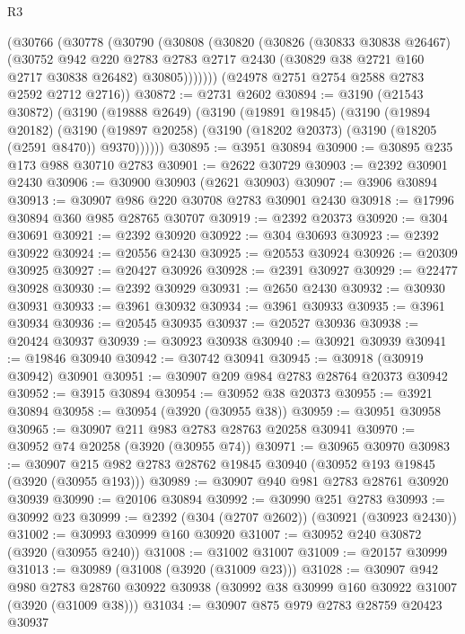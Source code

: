 \begin{lexlean}{R3}
\begin{coremodule}
      (@30766
        (@30778
          (@30790
            (@30808
              (@30820
                (@30826
                  (@30833 @30838 @26467)
                  (@30752
                    @942
                    @220
                    @2783
                    @2783
                    @2717
                    @2430
                    (@30829 @38 @2721 @160 @2717 @30838 @26482)
                    @30805)))))))
      (@24978 @2751 @2754 @2588 @2783 @2592 @2712 @2716))
@30872 := @2731 @2602
@30894 := @3190
    (@21543 @30872)
    (@3190
      (@19888 @2649)
      (@3190
        (@19891 @19845)
        (@3190
          (@19894 @20182)
          (@3190 (@19897 @20258) (@3190 (@18202 @20373) (@3190 (@18205 (@2591 @8470)) @9370))))))
@30895 := @3951 @30894
@30900 := @30895 @235 @173 @988 @30710 @2783
@30901 := @2622 @30729
@30903 := @2392 @30901 @2430
@30906 := @30900 @30903 (@2621 @30903)
@30907 := @3906 @30894
@30913 := @30907 @986 @220 @30708 @2783 @30901 @2430
@30918 := @17996 @30894 @360 @985 @28765 @30707
@30919 := @2392 @20373
@30920 := @304 @30691
@30921 := @2392 @30920
@30922 := @304 @30693
@30923 := @2392 @30922
@30924 := @20556 @2430
@30925 := @20553 @30924
@30926 := @20309 @30925
@30927 := @20427 @30926
@30928 := @2391 @30927
@30929 := @22477 @30928
@30930 := @2392 @30929
@30931 := @2650 @2430
@30932 := @30930 @30931
@30933 := @3961 @30932
@30934 := @3961 @30933
@30935 := @3961 @30934
@30936 := @20545 @30935
@30937 := @20527 @30936
@30938 := @20424 @30937
@30939 := @30923 @30938
@30940 := @30921 @30939
@30941 := @19846 @30940
@30942 := @30742 @30941
@30945 := @30918 (@30919 @30942) @30901
@30951 := @30907 @209 @984 @2783 @28764 @20373 @30942
@30952 := @3915 @30894
@30954 := @30952 @38 @20373
@30955 := @3921 @30894
@30958 := @30954 (@3920 (@30955 @38))
@30959 := @30951 @30958
@30965 := @30907 @211 @983 @2783 @28763 @20258 @30941
@30970 := @30952 @74 @20258 (@3920 (@30955 @74))
@30971 := @30965 @30970
@30983 := @30907 @215 @982 @2783 @28762 @19845 @30940 (@30952 @193 @19845 (@3920 (@30955 @193)))
@30989 := @30907 @940 @981 @2783 @28761 @30920 @30939
@30990 := @20106 @30894
@30992 := @30990 @251 @2783
@30993 := @30992 @23
@30999 := @2392 (@304 (@2707 @2602)) (@30921 (@30923 @2430))
@31002 := @30993 @30999 @160 @30920
@31007 := @30952 @240 @30872 (@3920 (@30955 @240))
@31008 := @31002 @31007
@31009 := @20157 @30999
@31013 := @30989 (@31008 (@3920 (@31009 @23)))
@31028 := @30907
    @942
    @980
    @2783
    @28760
    @30922
    @30938
    (@30992 @38 @30999 @160 @30922 @31007 (@3920 (@31009 @38)))
@31034 := @30907 @875 @979 @2783 @28759 @20423 @30937

\end{coremodule}
\end{lexlean}
